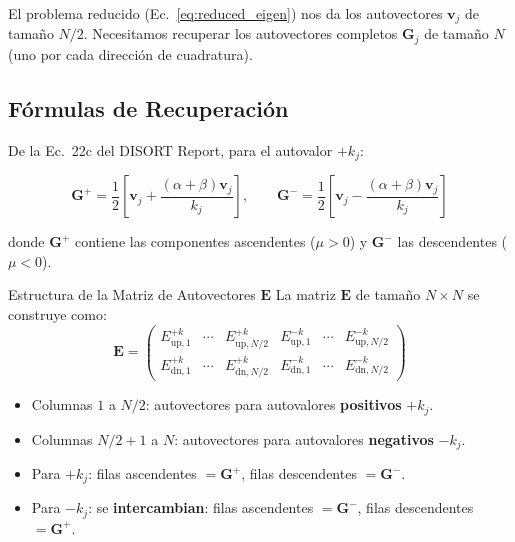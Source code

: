 \documentclass[a4paper,11pt]{article}
\begin{document}
El problema reducido (Ec.~\ref{eq:reduced_eigen}) nos da los autovectores $\mathbf{v}_j$ de tama\~no $N/2$. Necesitamos recuperar los autovectores completos $\mathbf{G}_j$ de tama\~no $N$ (uno por cada direcci\'on de cuadratura).

\subsection{F\'ormulas de Recuperaci\'on}

De la Ec.\ 22c del DISORT Report, para el autovalor $+k_j$:

\begin{equation}
\mathbf{G}^+ = \frac{1}{2}\left[\mathbf{v}_j + \frac{(\alpha + \beta)\mathbf{v}_j}{k_j}\right], \qquad
\mathbf{G}^- = \frac{1}{2}\left[\mathbf{v}_j - \frac{(\alpha + \beta)\mathbf{v}_j}{k_j}\right]
\label{eq:eigvec_recovery}
\end{equation}

donde $\mathbf{G}^+$ contiene las componentes ascendentes ($\mu > 0$) y $\mathbf{G}^-$ las descendentes ($\mu < 0$).

\begin{keyresult}{Estructura de la Matriz de Autovectores $\mathbf{E}$}
La matriz $\mathbf{E}$ de tama\~no $N \times N$ se construye como:
\begin{equation}
\mathbf{E} = \begin{pmatrix}
E_{\text{up}, 1}^{+k} & \cdots & E_{\text{up}, N/2}^{+k} & E_{\text{up}, 1}^{-k} & \cdots & E_{\text{up}, N/2}^{-k} \\[4pt]
E_{\text{dn}, 1}^{+k} & \cdots & E_{\text{dn}, N/2}^{+k} & E_{\text{dn}, 1}^{-k} & \cdots & E_{\text{dn}, N/2}^{-k}
\end{pmatrix}
\end{equation}
\begin{itemize}
\item Columnas $1$ a $N/2$: autovectores para autovalores \textbf{positivos} $+k_j$.
\item Columnas $N/2+1$ a $N$: autovectores para autovalores \textbf{negativos} $-k_j$.
\item Para $+k_j$: filas ascendentes $= \mathbf{G}^+$, filas descendentes $= \mathbf{G}^-$.
\item Para $-k_j$: se \textbf{intercambian}: filas ascendentes $= \mathbf{G}^-$, filas descendentes $= \mathbf{G}^+$.
\end{itemize}
\end{keyresult}
\end{document}

